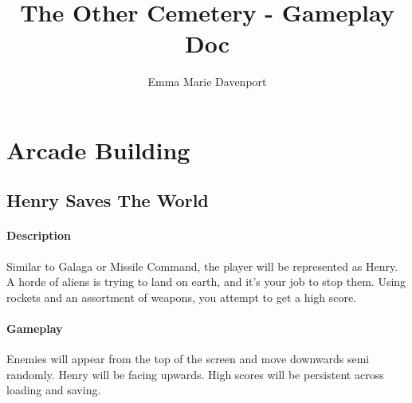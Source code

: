 \documentclass[12pt, a4paper, titlepage]{article}
\author{Emma Marie Davenport}
\title{The Other Cemetery - Gameplay Doc}
\begin{document}
    \maketitle
    
    \section{Arcade Building}
    \subsection{Henry Saves The World}
    
    \paragraph{Description} Similar to Galaga or Missile Command, the player will be represented as Henry. A horde of aliens is trying to land on earth, and it's your job to stop them. Using rockets and an 	assortment of weapons, you attempt to get a high score.
    
    \paragraph{Gameplay} Enemies will appear from the top of the screen and move downwards semi randomly. Henry will be facing upwards. High scores will be persistent across loading
    and saving.
    
\end{document}
